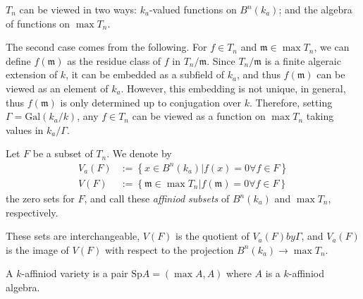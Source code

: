 $T_n$ can be viewed in two ways: $k_a$-valued functions on $B^n(k_a)$; and the algebra of functions
on $\max T_n$.

The second case comes from the following. For $f \in T_n$ and $\mathfrak{m} \in \max T_n$, we can
define $f (\mathfrak{m})$ as the residue class of $f$ in $T_n / \mathfrak{m}$. Since
$T_n / \mathfrak{m}$ is a finite algeraic extension of $k$, it can be embedded as a subfield of
$k_a$, and thus $f (\mathfrak{m})$ can be viewed as an element of $k_a$. However, this embedding is
not unique, in general, thus $f (\mathfrak{m})$ is only determined up to conjugation over $k$.
Therefore, setting $\Gamma = \text{Gal}(k_a/k)$, any $f \in T_n$ can be viewed as a function on
$\max T_n$ taking values in $k_a / \Gamma$.

\begin{definition}
  Let $F$ be a subset of $T_n$. We denote by
  \begin{align*}
    V_a(F) & := \left\{ x \in B^n(k_a) | f(x) = 0 \forall f \in F \right\} \\
    V(F) & := \left\{ \mathfrak{m} \in \max T_n | f (\mathfrak{m}) = 0 \forall f \in F \right\}
  \end{align*}
  the zero sets for $F$, and call these \emph{affiniod subsets} of $B^n (k_a)$ and $\max T_n$, respectively.
\end{definition}

These sets are interchangeable, $V(F)$ is the quotient of $V_a(F) by \Gamma$, and $V_a(F)$ is the
image of $V(F)$ with respect to the projection $B^n(k_a) \to \max T_n$.


\begin{definition}
  A $k$-affiniod variety is a pair $\text{Sp} A = (\max A, A)$ where $A$ is a $k$-affiniod algebra.
\end{definition}
